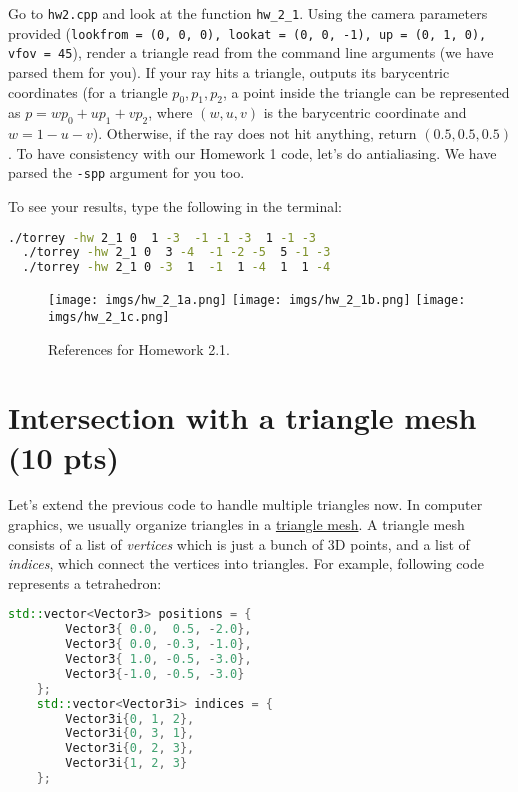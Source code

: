 Go to \lstinline{hw2.cpp} and look at the function \lstinline{hw_2_1}. Using the camera parameters provided (\lstinline{lookfrom = (0, 0, 0), lookat = (0, 0, -1), up = (0, 1, 0), vfov = 45}), render a triangle read from the command line arguments (we have parsed them for you). If your ray hits a triangle, outputs its barycentric coordinates (for a triangle $p_0, p_1, p_2$, a point inside the triangle can be represented as $p = w p_0 + u p_1 + v p_2$, where $(w, u, v)$ is the barycentric coordinate and $w = 1 - u - v$). Otherwise, if the ray does not hit anything, return $(0.5, 0.5, 0.5)$. To have consistency with our Homework 1 code, let's do antialiasing. We have parsed the \lstinline{-spp} argument for you too.

To see your results, type the following in the terminal:
\begin{lstlisting}[language=bash]
  ./torrey -hw 2_1 0  1 -3  -1 -1 -3  1 -1 -3
  ./torrey -hw 2_1 0  3 -4  -1 -2 -5  5 -1 -3
  ./torrey -hw 2_1 0 -3  1  -1  1 -4  1  1 -4
\end{lstlisting}

\begin{figure}[ht]
    \centering
    \texttt{[image: imgs/hw\_2\_1a.png]}
    \texttt{[image: imgs/hw\_2\_1b.png]}
    \texttt{[image: imgs/hw\_2\_1c.png]}
    \caption{References for Homework 2.1.}
    \label{fig:hw_2_1}
\end{figure}

\section{Intersection with a triangle mesh (10 pts)}
Let's extend the previous code to handle multiple triangles now. In computer graphics, we usually organize triangles in a \href{https://en.wikipedia.org/wiki/Triangle_mesh}{triangle mesh}. A triangle mesh consists of a list of \emph{vertices} which is just a bunch of 3D points, and a list of \emph{indices}, which connect the vertices into triangles. For example, following code represents a tetrahedron:
\begin{lstlisting}[language=C++]
    std::vector<Vector3> positions = {
        Vector3{ 0.0,  0.5, -2.0},
        Vector3{ 0.0, -0.3, -1.0},
        Vector3{ 1.0, -0.5, -3.0},
        Vector3{-1.0, -0.5, -3.0}
    };
    std::vector<Vector3i> indices = {
        Vector3i{0, 1, 2},
        Vector3i{0, 3, 1},
        Vector3i{0, 2, 3},
        Vector3i{1, 2, 3}
    };
\end{lstlisting}

